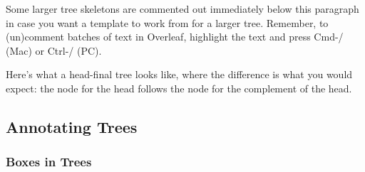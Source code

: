 \documentclass{article}
\begin{document}

\noindent Some larger tree skeletons are commented out immediately below this paragraph in case you want a template to work from for a larger tree. Remember, to (un)comment batches of text in Overleaf, highlight the text and press Cmd-/ (Mac) or Ctrl-/ (PC). 



Here's what a head-final tree looks like, where the difference is what you would expect: the node for the head follows the node for the complement of the head. 

\ea 
{}
\z 



\subsection{Annotating Trees}

\subsubsection{Boxes in Trees}
\end{document}

